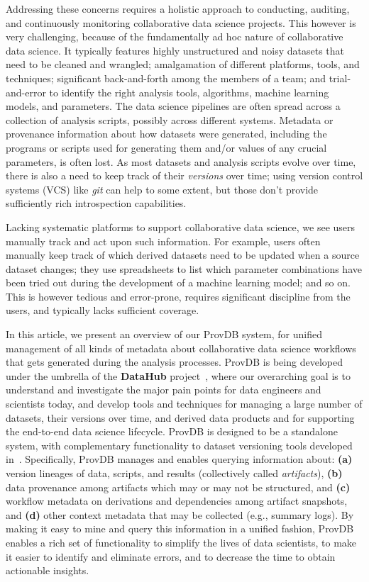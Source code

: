 \documentclass[11pt]{article}
\newcommand{\provdb}{{\sc ProvDB}\xspace}
\begin{document}
Addressing these concerns requires a holistic approach to conducting, auditing,
and continuously monitoring collaborative data science projects.  This however
is very challenging, because of the fundamentally ad hoc nature of collaborative
data science. It typically features highly unstructured and noisy datasets that
need to be cleaned and wrangled; amalgamation of different platforms, tools, and
techniques; significant back-and-forth among the members of a team; and
trial-and-error to identify the right analysis tools, algorithms, machine
learning models, and parameters. The data science pipelines are often spread
across a collection of analysis scripts, possibly across different systems.
Metadata or provenance information about how datasets were generated, including
the programs or scripts used for generating them and/or values of any crucial
parameters, is often lost.  As most datasets and analysis scripts evolve over
time, there is also a need to keep track of their {\em versions} over time;
using version control systems (VCS) like {\em git} can help to some extent, but
those don't provide sufficiently rich introspection capabilities.  

Lacking systematic platforms to support collaborative data science, we see users
manually track and act upon such information.  For example, users often manually
keep track of which derived datasets need to be updated when a source dataset
changes; they use spreadsheets to list which parameter combinations have been
tried out during the development of a machine learning model; and so on. This is
however tedious and error-prone, requires significant discipline from the users,
and typically lacks sufficient coverage.


In this article, we present an overview of our \provdb system, for unified
management of all kinds of metadata about collaborative data science workflows
that gets generated during the analysis processes. \provdb is being developed
under the umbrella of the {\bf DataHub} project~\cite{datahub2015}, where our
overarching goal is to understand and investigate the major pain points for data
engineers and scientists today, and develop tools and techniques for managing a
large number of datasets, their versions over time, and derived data products
and for supporting the end-to-end data science lifecycle. \provdb is designed to
be a standalone system, with complementary functionality to dataset versioning
tools developed
in~\cite{dataset2015,decibel,modelhub@icde17,dex@sigmod17,rstore}. Specifically,
\provdb manages and enables querying information about:
\textbf{(a)} version lineages of data, scripts, and results (collectively called {\em artifacts}),
\textbf{(b)} data provenance among artifacts which may or may not be structured, and
\textbf{(c)} workflow metadata on derivations and dependencies among artifact
snapshots, and \textbf{(d)} other context metadata that may be collected (e.g., summary logs).
By making it easy to mine and query this information in a unified fashion,
\provdb enables a rich set of functionality to simplify the lives of data
scientists, to make it easier to identify and eliminate errors, and to decrease
the time to obtain actionable insights.
\end{document}
